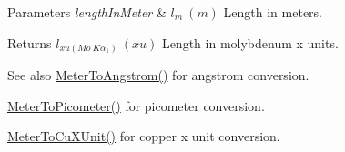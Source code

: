 \begin{DoxyParams}{Parameters}
{\em length\+In\+Meter} & $ l_{m}\ (m)$ Length in meters. \\
\hline
\end{DoxyParams}
\begin{DoxyReturn}{Returns}
$ l_{xu(Mo\ K\alpha_1)}\ (xu)$ Length in molybdenum x units. 
\end{DoxyReturn}
\begin{DoxySeeAlso}{See also}
\mbox{\hyperlink{group___e_g_x_math-_conversions-_length_conversions-_meter-_non-_s_i_ga9e6d5040f58d167bd7a4b6cebb5527ee}{Meter\+To\+Angstrom()}} for angstrom conversion. 

\mbox{\hyperlink{group___e_g_x_math-_conversions-_length_conversions-_meter-_s_i_ga5e136454c20254062d6e8637cfbfb8ee}{Meter\+To\+Picometer()}} for picometer conversion. 

\mbox{\hyperlink{group___e_g_x_math-_conversions-_length_conversions-_meter-_non-_s_i_ga67cec26b74704753fc51a8f4db27a4b4}{Meter\+To\+Cu\+X\+Unit()}} for copper x unit conversion. 
\end{DoxySeeAlso}
